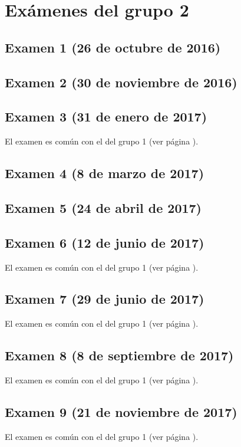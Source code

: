 \documentclass[a4paper,12pt,twoside]{book}
\begin{document}
\chapter{Exámenes del grupo 2}
\section{Examen 1 (26 de octubre de 2016)}
\section{Examen 2 (30 de noviembre de 2016)}
\section{Examen 3 (31 de enero de 2017)}
El examen es común con el del grupo 1 (ver página \pageref{examen_16_17_1_3}).
\section{Examen 4 (8 de marzo de 2017)}
\section{Examen 5 (24 de abril de 2017)}
\section{Examen 6 (12 de junio de 2017)} 
El examen es común con el del grupo 1 (ver página \pageref{examen_16_17_1_6}).
\section{Examen 7 (29 de junio de 2017)}
El examen es común con el del grupo 1 (ver página \pageref{examen_16_17_1_7}).
\section{Examen 8 (8 de septiembre de 2017)}
El examen es común con el del grupo 1 (ver página \pageref{examen_16_17_1_8}).
\section{Examen 9 (21 de noviembre de 2017)}
El examen es común con el del grupo 1 (ver página \pageref{examen_16_17_1_9}).
\end{document}
